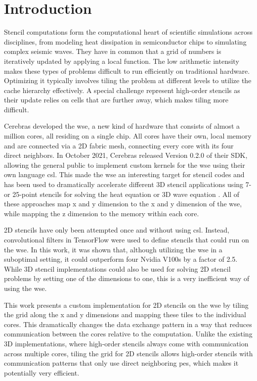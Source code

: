 \acresetall
\chapter{Introduction}
Stencil computations form the computational heart of scientific simulations across disciplines, from modeling heat dissipation in semiconductor chips to simulating complex seismic waves.
They have in common that a grid of numbers is iteratively updated by applying a local function.
The low arithmetic intensity makes these types of problems difficult to run efficiently on traditional hardware.
Optimizing it typically involves tiling the problem at different levels to utilize the cache hierarchy effectively.
A special challenge represent high-order stencils as their update relies on cells that are further away, which makes tiling more difficult.

Cerebras developed the \ac{wse}, a new kind of hardware that consists of almost a million cores, all residing on a single chip.
All cores have their own, local memory and are connected via a 2D fabric mesh, connecting every core with its four direct neighbors.
In October 2021, Cerebras released Version 0.2.0 of their SDK, allowing the general public to implement custom kernels for the \ac{wse} using their own language \ac{csl}. 
This made the \ac{wse} an interesting target for stencil codes and has been used to dramatically accelerate different 3D stencil applications using 7- or 25-point stencils for solving the heat equation or 3D wave equation \cite{jacquelin2022scalable,rocki2020fast,woo2022disruptive,sai2024matrix}.
All of these approaches map x and y dimension to the x and y dimension of the \ac{wse}, while mapping the z dimension to the memory within each core.

2D stencils have only been attempted once and without using \ac{csl}. Instead, convolutional filters in TensorFlow were used to define stencils that could run on the \ac{wse}\cite{brown2022tensorflow}. In this work, it was shown that, although utilizing the \ac{wse} in a suboptimal setting, it could outperform four Nvidia V100s by a factor of 2.5. While 3D stencil implementations could also be used for solving 2D stencil problems by setting one of the dimensions to one, this is a very inefficient way of using the \ac{wse}.

This work presents a custom implementation for 2D stencils on the \ac{wse} by tiling the grid along the x and y dimensions and mapping these tiles to the individual cores.
This dramatically changes the data exchange pattern in a way that reduces communication between the cores relative to the computation.
Unlike the existing 3D implementations, where high-order stencils always come with communication across multiple cores, tiling the grid for 2D stencils allows high-order stencils with communication patterns that only use direct neighboring \acp{pe}, which makes it potentially very efficient.

